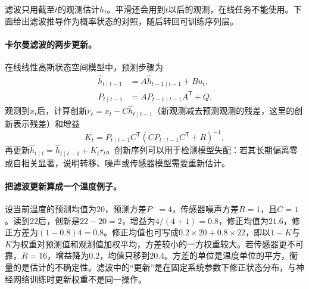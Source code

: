 滤波只用截至$t$的观测估计$h_t$。平滑还会用到$t$以后的观测，在线任务不能使用。下面给出滤波推导作为概率状态的对照，随后转回可训练序列层。

\paragraph{卡尔曼滤波的两步更新。}
在线线性高斯状态空间模型中，预测步骤为
\begin{align}
 \hat h_{t\mid t-1}&=A\hat h_{t-1\mid t-1}+Bu_t,\\
 P_{t\mid t-1}&=AP_{t-1\mid t-1}A^{\mathsf T}+Q.
\end{align}
观测到$x_t$后，计算创新$r_t=x_t-C\hat h_{t\mid t-1}$（新观测减去预测观测的残差，这里的创新表示残差）和增益
\begin{equation}
 K_t=P_{t\mid t-1}C^{\mathsf T}(CP_{t\mid t-1}C^{\mathsf T}+R)^{-1},
\end{equation}
再更新$\hat h_{t\mid t}=\hat h_{t\mid t-1}+K_tr_t$。创新序列可以用于检测模型失配：若其长期偏离零或自相关显著，说明转移、噪声或传感器模型需要重新估计。

\paragraph{把滤波更新算成一个温度例子。}
设当前温度的预测均值为$20$，预测方差$P^-=4$，传感器噪声方差$R=1$，且$C=1$。读到$22$后，创新是$22-20=2$，增益为$4/(4+1)=0.8$，修正均值为$21.6$，修正方差为$(1-0.8)4=0.8$。修正均值也可写成$0.2\times20+0.8\times22$，即以$1-K$与$K$为权重对预测值和观测值加权平均，方差较小的一方权重较大。若传感器更不可靠，$R=16$，增益降为$0.2$，均值只移到$20.4$。方差的单位是温度单位的平方，衡量的是估计的不确定性。滤波中的“更新”是在固定系统参数下修正状态分布，与神经网络训练时更新权重不是同一操作。

